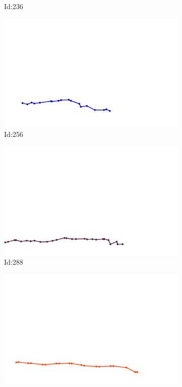 \documentclass[12pt,twoside]{report}
\begin{document}
\begin{figure}
\begin{subfigure}[b]{0.20\textwidth}
\caption{Id:236}
\end{subfigure}
\begin{subfigure}[b]{0.20\textwidth}
\centering
\includegraphics[width=\textwidth]{../trajectories/256.png}
\caption{Id:256}
\end{subfigure}
\begin{subfigure}[b]{0.20\textwidth}
\centering
\includegraphics[width=\textwidth]{../trajectories/288.png}
\caption{Id:288}
\end{subfigure}
\begin{subfigure}[b]{0.20\textwidth}
\centering
\includegraphics[width=\textwidth]{../trajectories/328.png}

\end{subfigure}
\end{figure}
\end{document}
